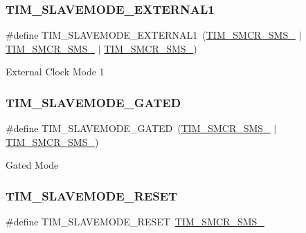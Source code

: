 \subsubsection{\texorpdfstring{TIM\_SLAVEMODE\_EXTERNAL1}{TIM\_SLAVEMODE\_EXTERNAL1}}
{\footnotesize\ttfamily \#define T\+I\+M\+\_\+\+S\+L\+A\+V\+E\+M\+O\+D\+E\+\_\+\+E\+X\+T\+E\+R\+N\+A\+L1~(\mbox{\hyperlink{group___peripheral___registers___bits___definition_ga63847fc3c71f582403e6301b1229c3ed}{T\+I\+M\+\_\+\+S\+M\+C\+R\+\_\+\+S\+M\+S\+\_}} $\vert$ \mbox{\hyperlink{group___peripheral___registers___bits___definition_gaa980a3121ab6cda5a4a42b959da8421e}{T\+I\+M\+\_\+\+S\+M\+C\+R\+\_\+\+S\+M\+S\+\_}} $\vert$ \mbox{\hyperlink{group___peripheral___registers___bits___definition_ga7d1ebece401aeb12abd466d2eafa78b2}{T\+I\+M\+\_\+\+S\+M\+C\+R\+\_\+\+S\+M\+S\+\_}})}

External Clock Mode 1 \mbox{\label{group___t_i_m___slave___mode_ga4501317fcd7649e5ff46db6fe69938e0}} 
\subsubsection{\texorpdfstring{TIM\_SLAVEMODE\_GATED}{TIM\_SLAVEMODE\_GATED}}
{\footnotesize\ttfamily \#define T\+I\+M\+\_\+\+S\+L\+A\+V\+E\+M\+O\+D\+E\+\_\+\+G\+A\+T\+ED~(\mbox{\hyperlink{group___peripheral___registers___bits___definition_ga63847fc3c71f582403e6301b1229c3ed}{T\+I\+M\+\_\+\+S\+M\+C\+R\+\_\+\+S\+M\+S\+\_}} $\vert$ \mbox{\hyperlink{group___peripheral___registers___bits___definition_ga7d1ebece401aeb12abd466d2eafa78b2}{T\+I\+M\+\_\+\+S\+M\+C\+R\+\_\+\+S\+M\+S\+\_}})}

Gated Mode \mbox{\label{group___t_i_m___slave___mode_ga9f28e350c0560dc550f5c0d2f8b39ba7}} 
\subsubsection{\texorpdfstring{TIM\_SLAVEMODE\_RESET}{TIM\_SLAVEMODE\_RESET}}
{\footnotesize\ttfamily \#define T\+I\+M\+\_\+\+S\+L\+A\+V\+E\+M\+O\+D\+E\+\_\+\+R\+E\+S\+ET~\mbox{\hyperlink{group___peripheral___registers___bits___definition_ga63847fc3c71f582403e6301b1229c3ed}{T\+I\+M\+\_\+\+S\+M\+C\+R\+\_\+\+S\+M\+S\+\_}}}

